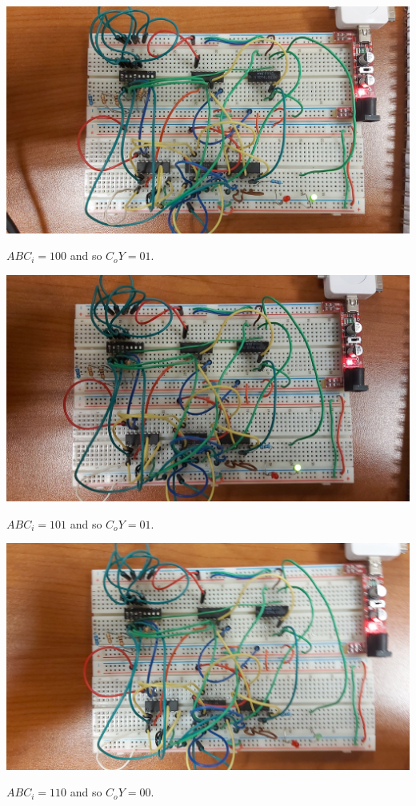 \documentclass{article}
\begin{document}
\includegraphics[angle=180, width=\textwidth]{./figures/10010.jpg}
\begin{center}
	$ABC_i = 100$ and so $C_o Y= 01$.
\end{center}

\vspace{2em}

\includegraphics[angle=180, width=\textwidth]{./figures/10110.jpg}
\begin{center}
	$ABC_i = 101$ and so $C_o Y= 01$.
\end{center}


\includegraphics[angle=180, width=\textwidth]{./figures/11010.jpg}
\begin{center}
	$ABC_i = 110$ and so $C_o Y= 00$.
\end{center}
\end{document}
